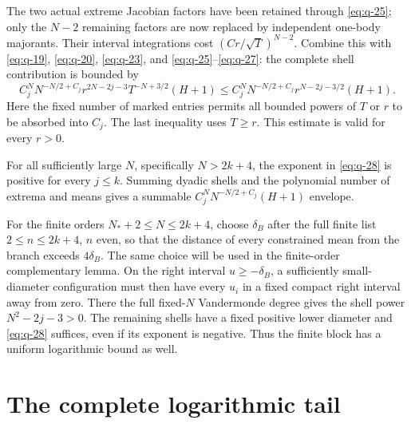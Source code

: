 \documentclass[11pt]{article}
\numberwithin{equation}{section}
\theoremstyle{remark}\newtheorem{remark}[theorem]{Remark}
\begin{document}
The two actual extreme Jacobian factors have been retained through
\eqref{eq:q-25}; only the $N-2$ remaining factors are now replaced by independent
one-body majorants. Their interval integrations cost
$(Cr/\sqrt T)^{N-2}$. Combine this with \eqref{eq:q-19}, \eqref{eq:q-20}, \eqref{eq:q-23}, and
\eqref{eq:q-25}--\eqref{eq:q-27}: the complete shell contribution is bounded by
\begin{equation}\label{eq:q-28}
C_j^NN^{-N/2+C_j}
 r^{2N-2j-3}T^{-N+3/2}(H+1)
 \le C_j^NN^{-N/2+C_j}r^{N-2j-3/2}(H+1).
\end{equation}
Here the fixed number of marked entries permits all bounded powers
of $T$ or $r$ to be absorbed into $C_j$. The last inequality uses
$T\ge r$. This estimate is valid for every $r>0$.

For all sufficiently large $N$, specifically $N>2k+4$, the exponent
in \eqref{eq:q-28} is positive for every $j\le k$. Summing dyadic shells and
the polynomial number of extrema and means gives a summable
$C_j^NN^{-N/2+C_j}(H+1)$ envelope.

For the finite orders $N_*+2\le N\le2k+4$, choose $\delta_B$ after
the full finite list $2\le n\le2k+4$, $n$ even, so that the distance
of every constrained mean from the branch exceeds $4\delta_B$.
The same choice will be used in the finite-order complementary lemma.
On the right interval $u\ge-\delta_B$,
a sufficiently small-diameter configuration must then have every
$u_i$ in a fixed compact right interval away from zero. There the
full fixed-$N$ Vandermonde degree gives the shell power
$N^2-2j-3>0$. The remaining shells have a fixed positive lower
diameter and \eqref{eq:q-28} suffices, even if its exponent is negative.
Thus the finite block has a uniform logarithmic bound as well.


\section{The complete logarithmic tail}
\label{sec:constrained-tail-sum}
\end{document}
